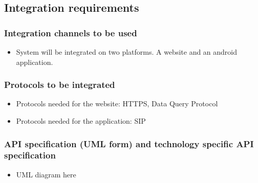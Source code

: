 \documentclass[11pt]{article}
\begin{document}
\subsection{Integration requirements}

	\subsubsection{Integration channels to be used}
		\begin{itemize}
			\item System will be integrated on two platforms. A website and an android application.
		\end{itemize}
	
	\subsubsection{Protocols to be integrated}
		\begin{itemize}
			\item Protocols needed for the website:  HTTPS, Data Query Protocol
			\item Protocols needed for the application: SIP
		\end{itemize}
	
	\subsubsection{API specification (UML form) and technology specific API specification}
		\begin{itemize}
			\item UML diagram here
		\end{itemize}
	
\end{document}
